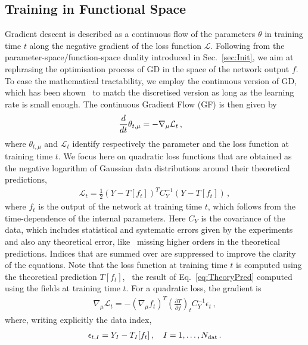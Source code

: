 \subsection{Training in Functional Space}
\label{sec:GradFlow}

Gradient descent is described as a continuous flow of the parameters $\theta$ in
training time $t$ along the negative gradient of the loss function
$\mathcal{L}$. Following from the parameter-space/function-space duality
introduced in Sec.~\ref{sec:Init}, we aim at rephrasing the optimisation process
of GD in the space of the network output $f$. To ease the mathematical
tractability, we employ the continuous version of GD, which has been
shown~\cite{barrett2022igr} to match the discretised version as long as the
learning rate is small enough. The continuous Gradient Flow (GF) is then given by
\begin{align}
    \label{eq:GradientFlowDef}
    \frac{d}{dt} &\theta_{t,\mu} = -\nabla_\mu \mathcal{L}_t\, ,
\end{align}
where $\theta_{t,\mu}$ and $\mathcal{L}_t$ identify respectively the parameter
and the loss function at training time $t$. We focus here on quadratic loss
functions that are obtained as the negative logarithm of Gaussian data
distributions around their theoretical predictions,
\begin{align}
    \label{eq:QuadLoss}
    \mathcal{L}_t = \frac12 \left(Y - T[f_t]\right)^T C_Y^{-1} \left(Y - T[f_t]\right)\, ,
\end{align}
where $f_t$ is the output of the network at training time $t$, which follows
from the time-dependence of the internal parameters. Here $C_Y$ is the
covariance of the data, which includes statistical and systematic errors given
by the experiments and also any theoretical error, like \eg\ missing higher
orders in the theoretical predictions. Indices that are summed over are
suppressed to improve the clarity of the equations. Note that the loss function
at training time $t$ is computed using the theoretical prediction $T[f_t]$, \ie\
the result of Eq.~\eqref{eq:TheoryPred} computed using the fields at training
time $t$. For a quadratic loss, the gradient is
\begin{align}
    \nabla_\mu \mathcal{L}_t = - \left(\nabla_\mu f_t\right)^T \left(\frac{\partial T}{\partial f}\right)_t
      C_Y^{-1} \epsilon_t\, ,
\end{align}
where, writing explicitly the data index,
\begin{align}
    \label{eq:EpsDef}
    \epsilon_{t,I} = Y_I - T_I[f_t]\, , \quad I=1, \ldots, N_{\mathrm{dat}}\, .
\end{align}
